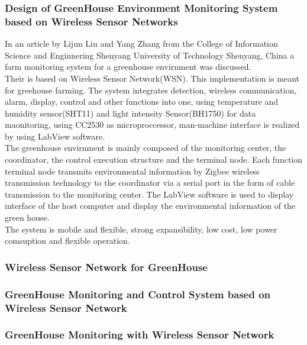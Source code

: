 \documentclass[12pt, a4paper]{article}
\begin{document}
\subsubsection{Design of GreenHouse Environment Monitoring System based on Wireless Sensor Networks}
In an article by Lijun Liu and Yang Zhang from the College of Information Science and Enginnering Shenyang University of Technology Shenyang, China a farm monitoring system for a greenhouse envirnment was discussed.\\
Their is based on Wireless Sensor Network(WSN). This implementation is meant for greehouse farming. The system integrates detection, wireless communication, alarm, display, control and other functions into one, using temperature and humidity sensor(SHT11) and light intensity Sensor(BH1750) for data maonitoring, using CC2530 as microproccessor, man-machine interface is realized by using LabView software.\\ 
The greenhouse envirnment is mainly composed of the monitoring center, the coordinator, the control execution structure and the terminal node. Each function terminal node  transmits environmental information by Zigbee wireless transmission technology to the coordinator via a serial port in the form of cable transmission to the monitoring center. The LabView software is used to display interface of the host computer and display the environmental information of the green house. \\
The system is mobile and flexible, strong expansibility, low cost, low power comsuption and flexible operation.
\subsubsection{Wireless Sensor Network for GreenHouse}


\subsubsection{GreenHouse Monitoring and Control System based on Wireless Sensor Network}

\subsubsection{GreenHouse Monitoring with Wireless Sensor Network}
\end{document}
